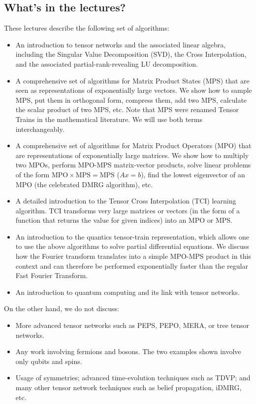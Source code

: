 \documentclass{SciPost}
\begin{document}
\subsection{What's in the lectures?}
These lectures describe the following set of algorithms:
\begin{itemize}
\item An introduction to tensor networks and the associated linear algebra, including the Singular Value Decomposition (SVD), the Cross Interpolation, and the associated partial-rank-revealing LU decomposition.

\item A comprehensive set of algorithms for Matrix Product States (MPS) that are seen as representations of exponentially large vectors. We show how to sample MPS, put them in orthogonal form, compress them, add two MPS, calculate the scalar product of two MPS, etc. Note that MPS
were renamed Tensor Trains in the mathematical literature. We will use both terms interchangeably.

\item A comprehensive set of algorithms for Matrix Product Operators (MPO) that are representations of exponentially large matrices. We show how to multiply two MPOs, perform MPO-MPS matrix-vector products, solve linear problems of the form $\mathrm{MPO}\times\mathrm{MPS}=\mathrm{MPS}$ ($Ax=b$), find the lowest eigenvector of an MPO (the celebrated DMRG algorithm), etc.

\item A detailed introduction to the Tensor Cross Interpolation (TCI) learning algorithm. TCI transforms very large matrices or vectors (in the form of a function that returns the value for given indices) into an MPO or MPS.

\item An introduction to the quantics tensor-train representation, which allows one to use the above algorithms to solve partial differential equations. We discuss how the Fourier transform translates into a simple MPO-MPS product in this context and can therefore be performed exponentially faster than the regular Fast Fourier Transform.

\item An introduction to quantum computing and its link with tensor networks.
\end{itemize}
On the other hand, we do not discuss:
\begin{itemize}
\item More advanced tensor networks such as PEPS, PEPO, MERA, or tree tensor networks.
\item Any work involving fermions and bosons. The two examples shown involve only qubits and spins.
\item Usage of symmetries; advanced time-evolution techniques such as TDVP; and many other tensor network techniques such as belief propagation, iDMRG, etc.
\end{itemize}
\end{document}
